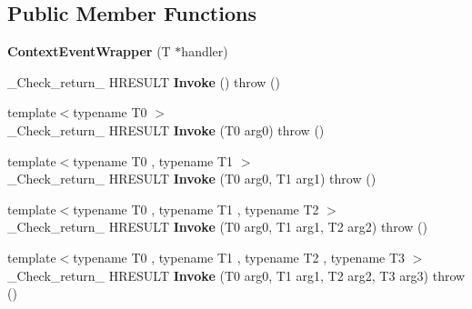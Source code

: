 \subsection*{Public Member Functions}
\begin{DoxyCompactItemize}
\item 
\mbox{\label{class_context_event_wrapper_a127556aceef447c13092a29ac4d23568}} 
{\bfseries Context\+Event\+Wrapper} (T $\ast$handler)
\item 
\mbox{\label{class_context_event_wrapper_a1e69afd159c2d3d09686dff60b43d9c3}} 
\+\_\+\+Check\+\_\+return\+\_\+ H\+R\+E\+S\+U\+LT {\bfseries Invoke} ()  throw ()
\item 
\mbox{\label{class_context_event_wrapper_aa31d038379691db36e80da560697d743}} 
{\footnotesize template$<$typename T0 $>$ }\\\+\_\+\+Check\+\_\+return\+\_\+ H\+R\+E\+S\+U\+LT {\bfseries Invoke} (T0 arg0)  throw ()
\item 
\mbox{\label{class_context_event_wrapper_a2a1a019c48372e4560e7b165818b479c}} 
{\footnotesize template$<$typename T0 , typename T1 $>$ }\\\+\_\+\+Check\+\_\+return\+\_\+ H\+R\+E\+S\+U\+LT {\bfseries Invoke} (T0 arg0, T1 arg1)  throw ()
\item 
\mbox{\label{class_context_event_wrapper_a3c39a03021128e223d102b925df56265}} 
{\footnotesize template$<$typename T0 , typename T1 , typename T2 $>$ }\\\+\_\+\+Check\+\_\+return\+\_\+ H\+R\+E\+S\+U\+LT {\bfseries Invoke} (T0 arg0, T1 arg1, T2 arg2)  throw ()
\item 
\mbox{\label{class_context_event_wrapper_a8c18aa69599a645ff88112233099e719}} 
{\footnotesize template$<$typename T0 , typename T1 , typename T2 , typename T3 $>$ }\\\+\_\+\+Check\+\_\+return\+\_\+ H\+R\+E\+S\+U\+LT {\bfseries Invoke} (T0 arg0, T1 arg1, T2 arg2, T3 arg3)  throw ()
\item 
\mbox{\label{class_context_event_wrapper_a3c8a18e91584e40dea449a815cf5e1f3}} 

\end{DoxyCompactItemize}
